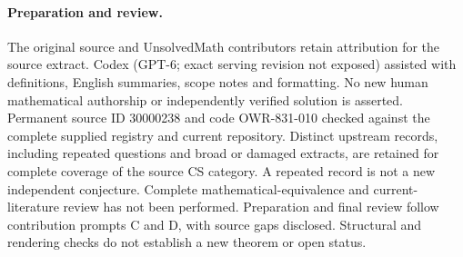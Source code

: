 \documentclass[11pt]{article}
\begin{document}
\paragraph{Preparation and review.}
The original source and UnsolvedMath contributors retain attribution for the source extract. Codex (GPT-6; exact serving revision not exposed) assisted with definitions, English summaries, scope notes and formatting. No new human mathematical authorship or independently verified solution is asserted. Permanent source ID 30000238 and code OWR-831-010 checked against the complete supplied registry and current repository. Distinct upstream records, including repeated questions and broad or damaged extracts, are retained for complete coverage of the source CS category. A repeated record is not a new independent conjecture. Complete mathematical-equivalence and current-literature review has not been performed. Preparation and final review follow contribution prompts C and D, with source gaps disclosed. Structural and rendering checks do not establish a new theorem or open status.
\label{end:30000238}
\end{document}
